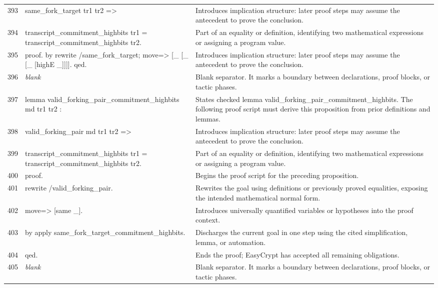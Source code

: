 \documentclass[10pt]{article}
\begin{document}
\begin{longtable}{r L{0.53\textwidth} L{0.37\textwidth}}
393 & {\ttfamily\scriptsize   same\_fork\_target tr1 tr2 =>} & Introduces implication structure: later proof steps may assume the antecedent to prove the conclusion. \\
394 & {\ttfamily\scriptsize   transcript\_commitment\_highbits tr1 = transcript\_commitment\_highbits tr2.} & Part of an equality or definition, identifying two mathematical expressions or assigning a program value. \\
395 & {\ttfamily\scriptsize proof. by rewrite /same\_fork\_target; move=> [\_ [\_ [\_ [highE \_]]]]. qed.} & Introduces implication structure: later proof steps may assume the antecedent to prove the conclusion. \\
396 & {\ttfamily\scriptsize \emph{blank}} & Blank separator.  It marks a boundary between declarations, proof blocks, or tactic phases. \\
397 & {\ttfamily\scriptsize lemma valid\_forking\_pair\_commitment\_highbits md tr1 tr2 :} & States checked lemma valid\_forking\_pair\_commitment\_highbits.  The following proof script must derive this proposition from prior definitions and lemmas. \\
398 & {\ttfamily\scriptsize   valid\_forking\_pair md tr1 tr2 =>} & Introduces implication structure: later proof steps may assume the antecedent to prove the conclusion. \\
399 & {\ttfamily\scriptsize   transcript\_commitment\_highbits tr1 = transcript\_commitment\_highbits tr2.} & Part of an equality or definition, identifying two mathematical expressions or assigning a program value. \\
400 & {\ttfamily\scriptsize proof.} & Begins the proof script for the preceding proposition. \\
401 & {\ttfamily\scriptsize rewrite /valid\_forking\_pair.} & Rewrites the goal using definitions or previously proved equalities, exposing the intended mathematical normal form. \\
402 & {\ttfamily\scriptsize move=> [same \_].} & Introduces universally quantified variables or hypotheses into the proof context. \\
403 & {\ttfamily\scriptsize by apply same\_fork\_target\_commitment\_highbits.} & Discharges the current goal in one step using the cited simplification, lemma, or automation. \\
404 & {\ttfamily\scriptsize qed.} & Ends the proof; EasyCrypt has accepted all remaining obligations. \\
405 & {\ttfamily\scriptsize \emph{blank}} & Blank separator.  It marks a boundary between declarations, proof blocks, or tactic phases. \\

\end{longtable}
\end{document}
